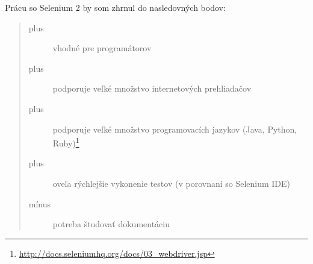 \noindent Prácu so Selenium 2 by som zhrnul do nasledovných bodov:
\begin{quote}
\begin{description}
\item[plus] vhodné pre programátorov
\item[plus] podporuje veľké množstvo internetových prehliadačov
\item[plus] podporuje veľké množstvo programovacích jazykov (Java, Python, Ruby)\footnote{\url{http://docs.seleniumhq.org/docs/03_webdriver.jsp}}
\item[plus] oveľa rýchlejšie vykonenie testov (v porovnaní so Selenium IDE) 
\item[mínus] potreba študovať dokumentáciu
\end{description}
\end{quote}